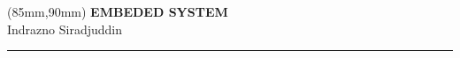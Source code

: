 \documentclass[12pt]{extreport}
\begin{document}



\thispagestyle{empty}
\begin{textblock*}{60mm}(85mm,90mm)
	\noindent
	{\sffamily\LARGE\bfseries EMBEDED SYSTEM}\\
	\noindent
	{\sffamily\small Indrazno Siradjuddin}\\
	{\color{dark-gray}\rule[5pt]{170pt}{3pt}}
\end{textblock*}
\null\newpage

% 


\thispagestyle{empty}
\null\newpage

\renewcommand\contentsname{Table of Contents} %
\tableofcontents



\thispagestyle{empty}
\null\newpage

\setcounter{page}{1}




% 
% 
% 
% 
% 
% 
% 
% 
% 
% 
% 
%     
%     
\ifodd\value{page}
\thispagestyle{empty}
\null\newpage
\fi
\end{document}
